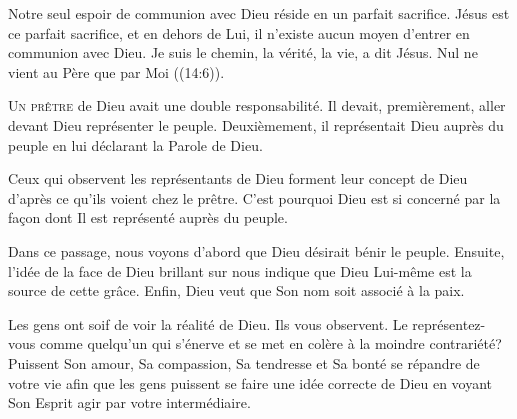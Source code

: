 Notre seul espoir de communion avec Dieu réside en un parfait sacrifice.
 Jésus est ce parfait sacrifice, et en dehors de Lui,
 il n'existe aucun moyen d'entrer en communion avec Dieu.
 \Og Je suis le chemin, la vérité, la vie, a dit Jésus.
 Nul ne vient au Père que par Moi \Fg{} ((14:6)). 

\dvrule







\lettrine{U}{n prêtre} de Dieu avait une double responsabilité.
 Il devait, premièrement, aller devant Dieu représenter le peuple.
 Deuxièmement, il représentait Dieu auprès du peuple
 en lui déclarant la Parole de Dieu. 


Ceux qui observent les représentants de Dieu forment leur concept de Dieu
 d'après ce qu'ils voient chez le prêtre.
 C'est pourquoi Dieu est si concerné par la fa\c{c}on dont Il est représenté
 auprès du peuple. 

Dans ce passage, nous voyons d'abord que Dieu désirait bénir le peuple.
 Ensuite, l'idée de la face de Dieu brillant sur nous indique
 que Dieu Lui-même est la source de cette grâce.
 Enfin, Dieu veut que Son nom soit associé à la paix. 

Les gens ont soif de voir la réalité de Dieu. Ils vous observent.
 Le représentez-vous comme quelqu'un qui s'énerve et se met en colère
 à la moindre contrariété? Puissent Son amour, Sa compassion,
 Sa tendresse et Sa bonté se répandre de votre vie afin que les gens
 puissent se faire une idée correcte de Dieu en voyant
 Son Esprit agir par votre intermédiaire. 

